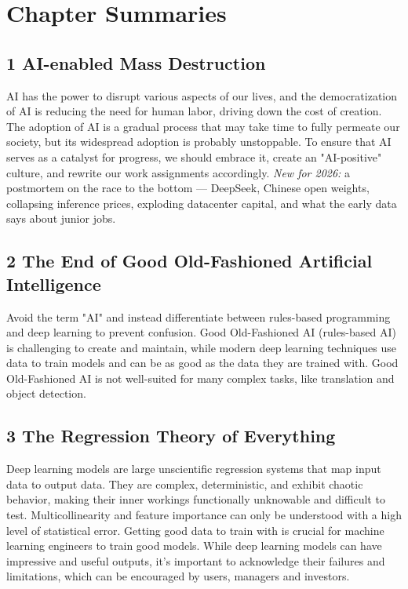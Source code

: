 \chapter*{Chapter Summaries}

\section*{1 AI-enabled Mass Destruction}

AI has the power to disrupt various aspects of our lives, and the democratization of AI is reducing the need for human labor, driving down the cost of creation. The adoption of AI is a gradual process that may take time to fully permeate our society, but its widespread adoption is probably unstoppable. To ensure that AI serves as a catalyst for progress, we should embrace it, create an "AI-positive" culture, and rewrite our work assignments accordingly. \textit{New for 2026:} a postmortem on the race to the bottom --- DeepSeek, Chinese open weights, collapsing inference prices, exploding datacenter capital, and what the early data says about junior jobs.

\section*{2 The End of Good Old-Fashioned Artificial Intelligence}

Avoid the term "AI" and instead differentiate between rules-based programming and deep learning to prevent confusion. Good Old-Fashioned AI (rules-based AI) is challenging to create and maintain, while modern deep learning techniques use data to train models and can be as good as the data they are trained with. Good Old-Fashioned AI is not well-suited for many complex tasks, like translation and object detection.

\section*{3 The Regression Theory of Everything}

Deep learning models are large unscientific regression systems that map input data to output data. They are complex, deterministic, and exhibit chaotic behavior, making their inner workings functionally unknowable and difficult to test. Multicollinearity and feature importance can only be understood with a high level of statistical error. Getting good data to train with is crucial for machine learning engineers to train good models. While deep learning models can have impressive and useful outputs, it’s important to acknowledge their failures and limitations, which can be encouraged by users, managers and investors.

